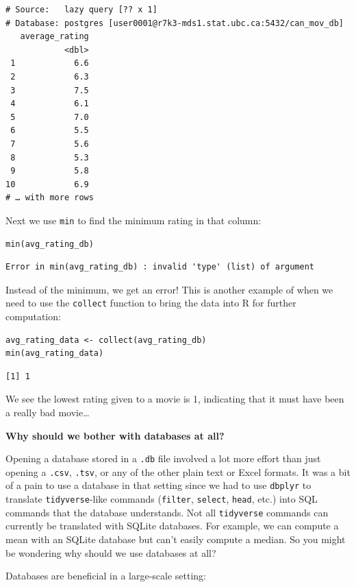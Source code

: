 \documentclass[
]{krantz}
\begin{document}
\begin{verbatim}
# Source:   lazy query [?? x 1]
# Database: postgres [user0001@r7k3-mds1.stat.ubc.ca:5432/can_mov_db]
   average_rating
            <dbl>
 1            6.6
 2            6.3
 3            7.5
 4            6.1
 5            7.0
 6            5.5
 7            5.6
 8            5.3
 9            5.8
10            6.9
# … with more rows
\end{verbatim}

Next we use \texttt{min} to find the minimum rating in that column:

\begin{verbatim}
min(avg_rating_db)
\end{verbatim}

\begin{verbatim}
Error in min(avg_rating_db) : invalid 'type' (list) of argument
\end{verbatim}

Instead of the minimum, we get an error! This is another example of when we need to use the \texttt{collect} function to bring the data into R for further computation:

\begin{verbatim}
avg_rating_data <- collect(avg_rating_db)
min(avg_rating_data)
\end{verbatim}

\begin{verbatim}
[1] 1
\end{verbatim}

We see the lowest rating given to a movie is 1, indicating that it must have been a really bad movie\ldots{}

\textbf{Why should we bother with databases at all?}

Opening a database stored in a \texttt{.db} file involved a lot more effort than just opening a \texttt{.csv}, \texttt{.tsv}, or any of the other plain text or Excel formats. It was a bit of a pain to use a database in that setting since we had to use \texttt{dbplyr} to translate \texttt{tidyverse}-like commands (\texttt{filter}, \texttt{select}, \texttt{head}, etc.) into SQL commands that the database understands. Not all \texttt{tidyverse} commands can currently be translated with SQLite databases. For example, we can compute a mean with an SQLite database but can't easily compute a median. So you might be wondering why should we use databases at all?

Databases are beneficial in a large-scale setting:
\end{document}
